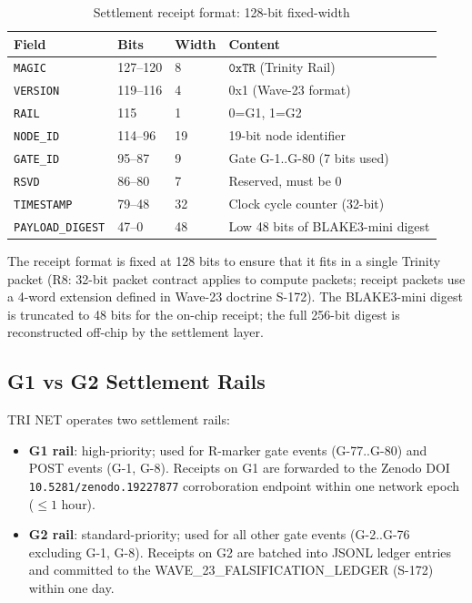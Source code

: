 \begin{table}[H]
\centering
\caption{Settlement receipt format: 128-bit fixed-width}
\label{tab74:receipt-format}
\small
\begin{tabular}{llll}
\toprule
Field & Bits & Width & Content \\
\midrule
\texttt{MAGIC}    & 127--120 & 8  & $\mathtt{0xTR}$ (Trinity Rail) \\
\texttt{VERSION}  & 119--116 & 4  & 0x1 (Wave-23 format) \\
\texttt{RAIL}     & 115      & 1  & 0=G1, 1=G2 \\
\texttt{NODE\_ID} & 114--96  & 19 & 19-bit node identifier \\
\texttt{GATE\_ID} & 95--87   & 9  & Gate G-1..G-80 (7 bits used) \\
\texttt{RSVD}     & 86--80   & 7  & Reserved, must be 0 \\
\texttt{TIMESTAMP}& 79--48   & 32 & Clock cycle counter (32-bit) \\
\texttt{PAYLOAD\_DIGEST} & 47--0 & 48 & Low 48 bits of BLAKE3-mini digest \\
\bottomrule
\end{tabular}
\end{table}

\begin{remark}
The receipt format is fixed at 128 bits to ensure that it fits in a single
Trinity packet (R8: 32-bit packet contract applies to compute packets;
receipt packets use a 4-word extension defined in Wave-23 doctrine S-172).
The BLAKE3-mini digest is truncated to 48 bits for the on-chip receipt;
the full 256-bit digest is reconstructed off-chip by the settlement layer.
\end{remark}

\subsection{G1 vs G2 Settlement Rails}
\label{sec74:g1-g2-rails}

TRI NET operates two settlement rails:

\begin{itemize}
  \item \textbf{G1 rail}: high-priority; used for R-marker gate events
    (G-77..G-80) and POST events (G-1, G-8).  Receipts on G1 are forwarded
    to the Zenodo DOI \texttt{10.5281/zenodo.19227877} corroboration
    endpoint within one network epoch ($\leq 1$ hour).
  \item \textbf{G2 rail}: standard-priority; used for all other gate events
    (G-2..G-76 excluding G-1, G-8).  Receipts on G2 are batched into
    JSONL ledger entries and committed to the WAVE\_23\_FALSIFICATION\_LEDGER
    (S-172) within one day.
\end{itemize}


